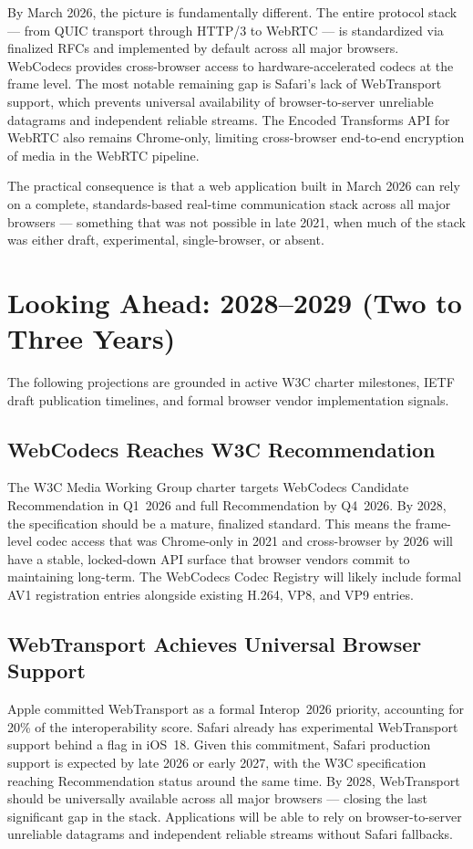 \documentclass[11pt]{article}
\begin{document}
By March 2026, the picture is fundamentally different. The entire protocol
stack --- from QUIC transport through HTTP/3 to WebRTC --- is standardized
via finalized RFCs and implemented by default across all major browsers.
WebCodecs provides cross-browser access to hardware-accelerated codecs at the
frame level. The most notable remaining gap is Safari's lack of WebTransport
support, which prevents universal availability of browser-to-server unreliable
datagrams and independent reliable streams. The Encoded Transforms API for
WebRTC also remains Chrome-only, limiting cross-browser end-to-end encryption
of media in the WebRTC pipeline.

The practical consequence is that a web application built in March 2026 can
rely on a complete, standards-based real-time communication stack across all
major browsers --- something that was not possible in late 2021, when much of
the stack was either draft, experimental, single-browser, or absent.

\section{Looking Ahead: 2028--2029 (Two to Three Years)}

The following projections are grounded in active W3C charter milestones, IETF
draft publication timelines, and formal browser vendor implementation signals.

\subsection{WebCodecs Reaches W3C Recommendation}

The W3C Media Working Group charter targets WebCodecs Candidate
Recommendation in Q1~2026 and full Recommendation by Q4~2026. By 2028, the
specification should be a mature, finalized standard. This means the
frame-level codec access that was Chrome-only in 2021 and cross-browser by
2026 will have a stable, locked-down API surface that browser vendors commit
to maintaining long-term. The WebCodecs Codec Registry will likely include
formal AV1 registration entries alongside existing H.264, VP8, and VP9
entries.

\subsection{WebTransport Achieves Universal Browser Support}

Apple committed WebTransport as a formal Interop~2026 priority, accounting
for 20\% of the interoperability score. Safari already has experimental
WebTransport support behind a flag in iOS~18. Given this commitment, Safari
production support is expected by late 2026 or early 2027, with the W3C
specification reaching Recommendation status around the same time. By 2028,
WebTransport should be universally available across all major browsers ---
closing the last significant gap in the stack. Applications will be able to
rely on browser-to-server unreliable datagrams and independent reliable
streams without Safari fallbacks.
\end{document}
